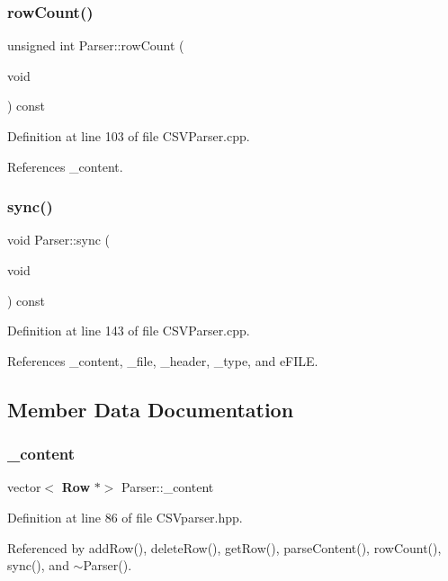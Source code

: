 \subsubsection{row\+Count()}
{\footnotesize\ttfamily unsigned int Parser\+::row\+Count (\begin{DoxyParamCaption}\item[{void}]{ }\end{DoxyParamCaption}) const}



Definition at line 103 of file C\+S\+V\+Parser.\+cpp.



References \+\_\+content.

\mbox{\label{class_parser_aa92421ad7f5c4bb158b0b2f389458947}} 
\subsubsection{sync()}
{\footnotesize\ttfamily void Parser\+::sync (\begin{DoxyParamCaption}\item[{void}]{ }\end{DoxyParamCaption}) const}



Definition at line 143 of file C\+S\+V\+Parser.\+cpp.



References \+\_\+content, \+\_\+file, \+\_\+header, \+\_\+type, and e\+F\+I\+LE.



\subsection{Member Data Documentation}
\mbox{\label{class_parser_a47c9a793cb0869cb19a60883eebc469d}} 
\subsubsection{\+\_\+content}
{\footnotesize\ttfamily vector$<$\textbf{ Row} $\ast$$>$ Parser\+::\+\_\+content\hspace{0.3cm}{\ttfamily [private]}}



Definition at line 86 of file C\+S\+Vparser.\+hpp.



Referenced by add\+Row(), delete\+Row(), get\+Row(), parse\+Content(), row\+Count(), sync(), and $\sim$\+Parser().

